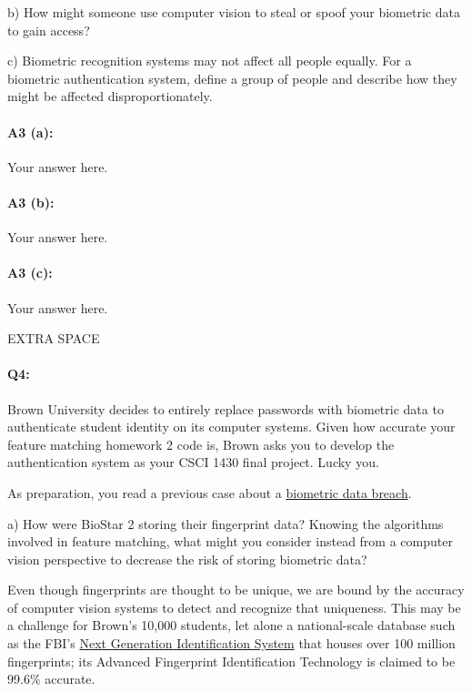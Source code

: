 b) How might someone use computer vision to steal or spoof your biometric data to gain access?

c) Biometric recognition systems may not affect all people equally. For a biometric authentication system, define a group of people and describe how they might be affected disproportionately.

\paragraph{A3 (a):} Your answer here.

\paragraph{A3 (b):} Your answer here.

\paragraph{A3 (c):} Your answer here.
\pagebreak


EXTRA SPACE
\pagebreak


\paragraph{Q4:} Brown University decides to entirely replace passwords with biometric data to authenticate student identity on its computer systems. Given how accurate your feature matching homework 2 code is, Brown asks you to develop the authentication system as your CSCI 1430 final project. Lucky you.

As preparation, you read a previous case about a \href{https://www.vpnmentor.com/blog/report-biostar2-leak/}{biometric data breach}.

a) How were BioStar 2 storing their fingerprint data? Knowing the algorithms involved in feature matching, what might you consider instead from a computer vision perspective to decrease the risk of storing biometric data?

Even though fingerprints are thought to be unique, we are bound by the accuracy of computer vision systems to detect and recognize that uniqueness.
This may be a challenge for Brown's 10,000 students, let alone a national-scale database such as the FBI's \href{https://www.fbi.gov/services/cjis/fingerprints-and-other-biometrics/ngi}{Next Generation Identification System} that houses over 100 million fingerprints; its Advanced Fingerprint Identification Technology is claimed to be 99.6\% accurate.

